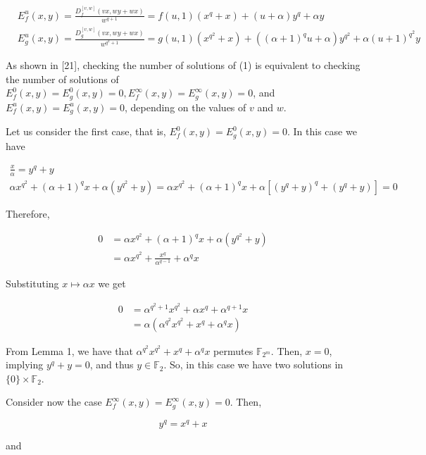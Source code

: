 \documentclass[10pt]{article}
\begin{document}
$$
\begin{aligned}
& E_{f}^{u}(x, y)=\frac{D_{f}^{[v, w]}(v x, w y+w x)}{w^{q+1}}=f(u, 1)\left(x^{q}+x\right)+(u+\alpha) y^{q}+\alpha y \\
& E_{g}^{u}(x, y)=\frac{D_{g}^{[v, w]}(v x, w y+w x)}{w^{q^{2}+1}}=g(u, 1)\left(x^{q^{2}}+x\right)+\left((\alpha+1)^{q} u+\alpha\right) y^{q^{2}}+\alpha(u+1)^{q^{2}} y
\end{aligned}
$$

As shown in [21], checking the number of solutions of (1) is equivalent to checking the number of solutions of $E_{f}^{0}(x, y)=E_{g}^{0}(x, y)=0, E_{f}^{\infty}(x, y)=E_{g}^{\infty}(x, y)=0$, and $E_{f}^{u}(x, y)=E_{g}^{u}(x, y)=0$, depending on the values of $v$ and $w$.

Let us consider the first case, that is, $E_{f}^{0}(x, y)=E_{g}^{0}(x, y)=0$. In this case we have

$$
\begin{gathered}
\frac{x}{\alpha}=y^{q}+y \\
\alpha x^{q^{2}}+(\alpha+1)^{q} x+\alpha\left(y^{q^{2}}+y\right)=\alpha x^{q^{2}}+(\alpha+1)^{q} x+\alpha\left[\left(y^{q}+y\right)^{q}+\left(y^{q}+y\right)\right]=0
\end{gathered}
$$

Therefore,

$$
\begin{aligned}
0 & =\alpha x^{q^{2}}+(\alpha+1)^{q} x+\alpha\left(y^{q^{2}}+y\right) \\
& =\alpha x^{q^{2}}+\frac{x^{q}}{\alpha^{q-1}}+\alpha^{q} x
\end{aligned}
$$

Substituting $x \mapsto \alpha x$ we get

$$
\begin{aligned}
0 & =\alpha^{q^{2}+1} x^{q^{2}}+\alpha x^{q}+\alpha^{q+1} x \\
& =\alpha\left(\alpha^{q^{2}} x^{q^{2}}+x^{q}+\alpha^{q} x\right)
\end{aligned}
$$

From Lemma 1, we have that $\alpha^{q^{2}} x^{q^{2}}+x^{q}+\alpha^{q} x$ permutes $\mathbb{F}_{2^{m}}$. Then, $x=0$, implying $y^{q}+y=0$, and thus $y \in \mathbb{F}_{2}$. So, in this case we have two solutions in $\{0\} \times \mathbb{F}_{2}$.

Consider now the case $E_{f}^{\infty}(x, y)=E_{g}^{\infty}(x, y)=0$. Then,

$$
y^{q}=x^{q}+x
$$

and
\end{document}
